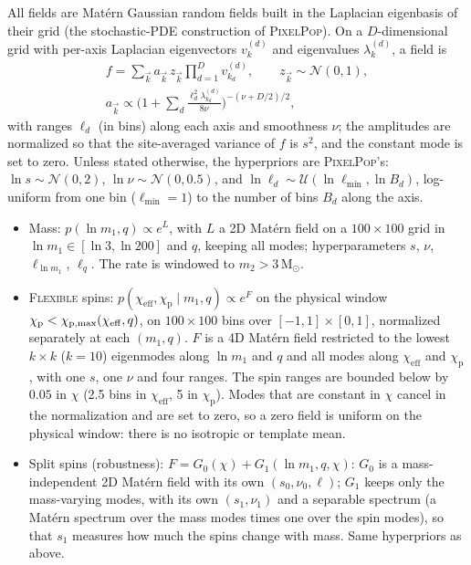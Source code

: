 \documentclass[%
 reprint,
 amsmath,amssymb,
 aps,
 prl,
 nofootinbib,nobibnotes,
]{revtex4-2}
\newcommand{\Msun}{\ensuremath{\mathrm{M}_{\odot}}}
\newcommand{\chieff}{\ensuremath{\chi_{\mathrm{eff}}}}
\newcommand{\chip}{\ensuremath{\chi_{\mathrm{p}}}}
\newcommand{\red}[1]{{\color{Red} #1}}
\newcommand{\PixelPop}{\textsc{PixelPop}\xspace}
\newcommand{\flexiblespins}{\textsc{Flexible}\xspace}
\begin{document}
\red{All fields are Mat\'ern Gaussian random fields built in the Laplacian eigenbasis of their grid (the stochastic-PDE construction of \PixelPop). On a $D$-dimensional grid with per-axis Laplacian eigenvectors $v^{(d)}_k$ and eigenvalues $\lambda^{(d)}_k$, a field is
\begin{gather}
    f = \sum_{\vec{k}} a_{\vec{k}}\, z_{\vec{k}} \prod_{d=1}^{D} v^{(d)}_{k_d}, \qquad z_{\vec{k}} \sim \mathcal{N}(0, 1), \\
    a_{\vec{k}} \propto \Big(1 + \sum_{d} \frac{\ell_d^2 \lambda^{(d)}_{k_d}}{8\nu}\Big)^{-(\nu + D/2)/2},
\end{gather}
with ranges $\ell_d$ (in bins) along each axis and smoothness $\nu$; the amplitudes are normalized so that the site-averaged variance of $f$ is $s^2$, and the constant mode is set to zero. Unless stated otherwise, the hyperpriors are \PixelPop's: $\ln s \sim \mathcal{N}(0, 2)$, $\ln \nu \sim \mathcal{N}(0, 0.5)$, and $\ln \ell_d \sim \mathcal{U}(\ln \ell_{\min}, \ln B_d)$, log-uniform from one bin ($\ell_{\min} = 1$) to the number of bins $B_d$ along the axis.
\begin{itemize}
\item Mass: $p(\ln m_1, q) \propto e^{L}$, with $L$ a 2D Mat\'ern field on a $100 \times 100$ grid in $\ln m_1 \in [\ln 3, \ln 200]$ and $q$, keeping all modes; hyperparameters $s$, $\nu$, $\ell_{\ln m_1}$, $\ell_q$. The rate is windowed to $m_2 > 3\,\Msun$.
\item \flexiblespins spins: $p(\chieff, \chip \mid m_1, q) \propto e^{F}$ on the physical window $\chip < \chi_{\rm p, max}(\chieff, q)$, on $100 \times 100$ bins over $[-1, 1] \times [0, 1]$, normalized separately at each $(m_1, q)$. $F$ is a 4D Mat\'ern field restricted to the lowest $k \times k$ ($k = 10$) eigenmodes along $\ln m_1$ and $q$ and all modes along $\chieff$ and $\chip$, with one $s$, one $\nu$ and four ranges. The spin ranges are bounded below by $0.05$ in $\chi$ (2.5 bins in $\chieff$, 5 in $\chip$). Modes that are constant in $\chi$ cancel in the normalization and are set to zero, so a zero field is uniform on the physical window: there is no isotropic or template mean.
\item Split spins (robustness): $F = G_0(\chi) + G_1(\ln m_1, q, \chi)$: $G_0$ is a mass-independent 2D Mat\'ern field with its own $(s_0, \nu_0, \ell)$; $G_1$ keeps only the mass-varying modes, with its own $(s_1, \nu_1)$ and a separable spectrum (a Mat\'ern spectrum over the mass modes times one over the spin modes), so that $s_1$ measures how much the spins change with mass. Same hyperpriors as above.

\end{itemize}}
\end{document}

